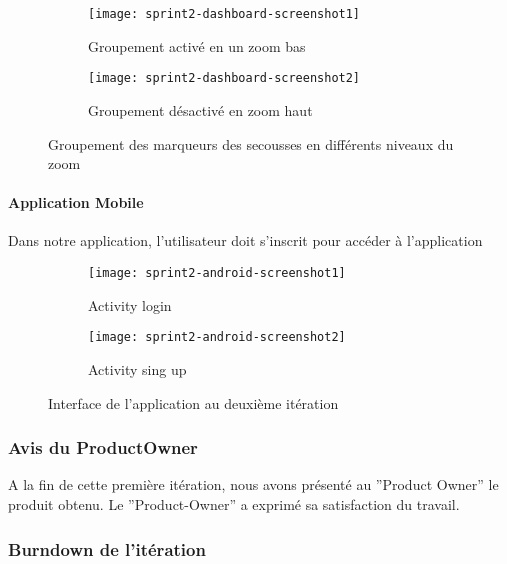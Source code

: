 \begin{figure}[htbp]
    \begin{subfigure}{.5\textwidth}
        \centering
        \texttt{[image: sprint2-dashboard-screenshot1]}
        \caption{Groupement activé en un zoom bas}
        \label{fig:sprint2-dashboard-screenshot1}
    \end{subfigure}
    \begin{subfigure}{.5\textwidth}
        \centering
        \texttt{[image: sprint2-dashboard-screenshot2]}
        \caption{Groupement désactivé en zoom haut}
        \label{fig:sprint2-dashboard-screenshot2}
    \end{subfigure}
    \caption{Groupement des marqueurs des secousses en différents niveaux du zoom}
\end{figure}
\clearpage

\paragraph{Application Mobile }

Dans notre application, l'utilisateur doit s'inscrit pour accéder à 
l'application 


\begin{figure}[htbp]
    \begin{subfigure}{.5\textwidth}
    \centering
  \centering
  \texttt{[image: sprint2-android-screenshot1]}
  \caption{Activity login}
  \label{fig:sprint2-android-screenshot1}
\end{subfigure}
\begin{subfigure}{.5\textwidth}
    \centering
  \centering
  \texttt{[image: sprint2-android-screenshot2]}
  \caption{Activity sing up}
  \label{fig:sprint2-android-screenshot2}
\end{subfigure}
\caption{Interface de l'application au deuxième itération}
\end{figure}

\subsubsection{Avis du ProductOwner}
A la fin de cette première itération, nous avons présenté au ”Product Owner” le produit
obtenu. Le ”Product-Owner” a exprimé sa satisfaction du travail.

\subsubsection{Burndown de l’itération}

\subsubsection*{}

\clearpage
